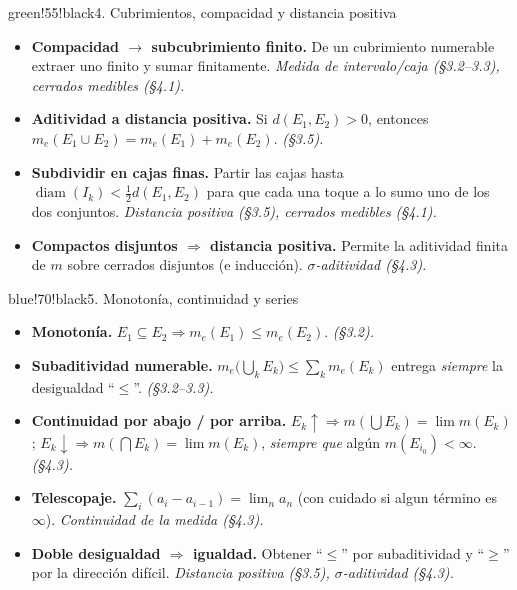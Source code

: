 \documentclass[11pt,twoside]{article}
\DeclareMathOperator{\diam}{diam}
\begin{document}
\begin{equivbox}{green!55!black}{4. Cubrimientos, compacidad y distancia positiva}
\begin{itemize}[leftmargin=2em,itemsep=2pt]
\item \textbf{Compacidad $\to$ subcubrimiento finito.} De un cubrimiento numerable extraer uno finito y sumar finitamente. \hfill\textit{Medida de intervalo/caja (§3.2--3.3), cerrados medibles (§4.1).}
\item \textbf{Aditividad a distancia positiva.} Si $d(E_{1}, E_{2}) > 0$, entonces $m_{e}(E_{1} \cup E_{2}) = m_{e}(E_{1}) + m_{e}(E_{2})$. \hfill\textit{(§3.5).}
\item \textbf{Subdividir en cajas finas.} Partir las cajas hasta $\diam(I_{k}) < \tfrac{1}{2} d(E_{1}, E_{2})$ para que cada una toque a lo sumo uno de los dos conjuntos. \hfill\textit{Distancia positiva (§3.5), cerrados medibles (§4.1).}
\item \textbf{Compactos disjuntos $\Rightarrow$ distancia positiva.} Permite la aditividad finita de $m$ sobre cerrados disjuntos (e inducci\'on). \hfill\textit{$\sigma$-aditividad (§4.3).}
\end{itemize}
\end{equivbox}

\begin{equivbox}{blue!70!black}{5. Monoton\'ia, continuidad y series}
\begin{itemize}[leftmargin=2em,itemsep=2pt]
\item \textbf{Monoton\'ia.} $E_{1} \subseteq E_{2} \Rightarrow m_{e}(E_{1}) \leq m_{e}(E_{2})$. \hfill\textit{(§3.2).}
\item \textbf{Subaditividad numerable.} $m_{e}\big(\bigcup_{k} E_{k}\big) \leq \sum_{k} m_{e}(E_{k})$ entrega \emph{siempre} la desigualdad ``$\leq$''. \hfill\textit{(§3.2--3.3).}
\item \textbf{Continuidad por abajo / por arriba.} $E_{k} \uparrow \Rightarrow m(\bigcup E_{k}) = \lim m(E_{k})$; $E_{k} \downarrow \Rightarrow m(\bigcap E_{k}) = \lim m(E_{k})$, \emph{siempre que} alg\'un $m(E_{i_{0}}) < \infty$. \hfill\textit{(§4.3).}
\item \textbf{Telescopaje.} $\sum_{i}(a_{i} - a_{i-1}) = \lim_{n} a_{n}$ (con cuidado si algun t\'ermino es $\infty$). \hfill\textit{Continuidad de la medida (§4.3).}
\item \textbf{Doble desigualdad $\Rightarrow$ igualdad.} Obtener ``$\leq$'' por subaditividad y ``$\geq$'' por la direcci\'on dif\'icil. \hfill\textit{Distancia positiva (§3.5), $\sigma$-aditividad (§4.3).}
\end{itemize}
\end{equivbox}
\end{document}
